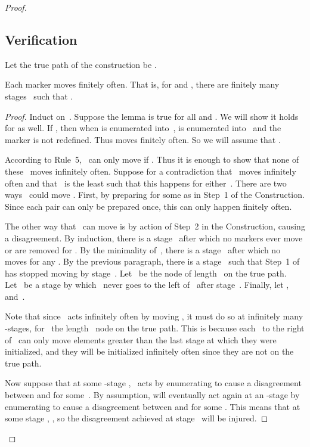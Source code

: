 \documentclass{LMCS}
\newcommand{\0}{\mathbf{0}}
\newcommand{\<}{\langle}
\renewcommand{\>}{\rangle}
\begin{document}
\begin{proof}
\subsection{Verification}\label{minpairverif}

Let the true path of the construction be .

\begin{lem}\label{finitemovement}
Each marker moves finitely often.  That is, for  and ,
there are finitely many stages~ such that .
\end{lem}

\begin{proof}
Induct on~.  Suppose the lemma is true for all  and .
We will show it holds for  as well.  If , then when  is
enumerated into~,  is enumerated into~ and the
marker is not redefined.  Thus  moves finitely often.  So we
will assume that .

According to Rule~5,~ can only move  if .  Thus it is enough to show that none of these~ moves
 infinitely often.  Suppose for a contradiction that~ moves  infinitely often and that~ is the least such
that this happens for either~.  There are two ways~ could
move .  First, by preparing  for some
 as in Step~1 of the Construction.  Since each pair  can only be prepared once, this can only happen finitely often.



The other way that~ can move  is by action of
Step~2 in the Construction, causing a disagreement.  By induction, there is a
stage~ after which no markers  ever move or are removed
for .  By the minimality of~, there is a stage~ after which
no~ moves  for any . By the previous
paragraph, there is a stage~ such that Step~1 of~ has
stopped moving  by stage~.  Let~ be the node of
length~ on the true path.  Let~ be a stage by which~ never
goes to the left of~ after stage~.  Finally, let , and~.

Note that since~ acts infinitely often by moving
, it must do so at infinitely many -stages,
for~ the length~ node on the true path.  This is because
each~ to the right of~ can only move elements greater than
the last stage at which they were initialized, and they will be initialized
infinitely often since they are not on the true path.

Now suppose that at some -stage ,~ acts by
enumerating  to cause a disagreement between
 and  for some~.  By assumption,
 will eventually act again at an -stage by enumerating
 to cause a disagreement between  and
 for some .  This means that at some stage ,
, so the disagreement achieved at stage~ will be injured.


\end{proof}
\end{proof}
\end{document}
